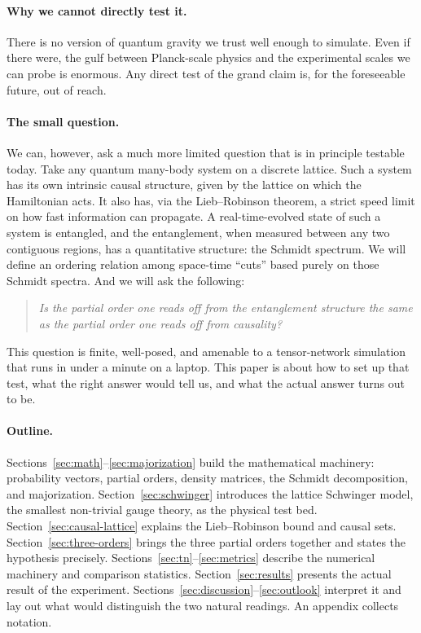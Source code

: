 \documentclass[11pt,a4paper]{article}
\theoremstyle{definition}
\theoremstyle{plain}
\theoremstyle{remark}
\begin{document}
\paragraph{Why we cannot directly test it.}
There is no version of quantum gravity we trust well enough to
simulate.  Even if there were, the gulf between Planck-scale physics
and the experimental scales we can probe is enormous.  Any direct test
of the grand claim is, for the foreseeable future, out of reach.

\paragraph{The small question.}
We can, however, ask a much more limited question that is in principle
testable today.  Take any quantum many-body system on a discrete
lattice.  Such a system has its own intrinsic causal structure, given
by the lattice on which the Hamiltonian acts.  It also has, via the
Lieb--Robinson theorem, a strict speed limit on how fast information
can propagate.  A real-time-evolved state of such a system is
entangled, and the entanglement, when measured between any two
contiguous regions, has a quantitative structure: the Schmidt
spectrum.  We will define an ordering relation among space-time
``cuts'' based purely on those Schmidt spectra.  And we will ask the
following:
\begin{quote}\itshape
  Is the partial order one reads off from the entanglement structure
  the same as the partial order one reads off from causality?
\end{quote}
This question is finite, well-posed, and amenable to a tensor-network
simulation that runs in under a minute on a laptop.  This paper is
about how to set up that test, what the right answer would tell us,
and what the actual answer turns out to be.

\paragraph{Outline.}
Sections~\ref{sec:math}--\ref{sec:majorization} build the mathematical
machinery: probability vectors, partial orders, density matrices, the
Schmidt decomposition, and majorization.
Section~\ref{sec:schwinger} introduces the lattice Schwinger model,
the smallest non-trivial gauge theory, as the physical test bed.
Section~\ref{sec:causal-lattice} explains the Lieb--Robinson bound and
causal sets.  Section~\ref{sec:three-orders} brings the three partial
orders together and states the hypothesis precisely.
Sections~\ref{sec:tn}--\ref{sec:metrics} describe the numerical
machinery and comparison statistics.  Section~\ref{sec:results}
presents the actual result of the experiment.
Sections~\ref{sec:discussion}--\ref{sec:outlook} interpret it and lay
out what would distinguish the two natural readings.  An appendix
collects notation.
\end{document}
